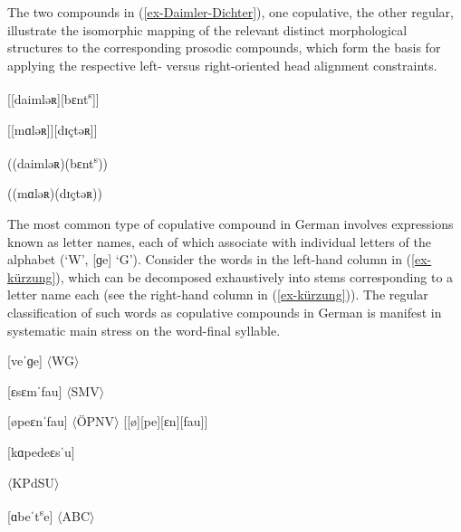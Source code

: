 \documentclass[output=paper
 ,nobabel
 ,draftmode
 ,colorlinks, citecolor=brown
]{langscibook}
\begin{document}
\zl

\largerpage
\enlargethispage{3pt}
\noindent
The two compounds in (\ref{ex-Daimler-Dichter}), one copulative, the other regular, illustrate the isomorphic mapping of the relevant distinct morphological structures to the corresponding prosodic compounds, which form the basis for applying the respective left- versus right-oriented head alignment constraints.


\eal\label{ex-Daimler-Dichter}
\ex {}[[daimləʀ]\textbf{}[bɛnt\textsuperscript{s}]\textbf{}]\textbf{}

\ex {}[[mɑləʀ]]\textbf{}[dɪçtəʀ]\textbf{}]\textbf{}
\z

\ex\label{ex-Daimler-Benz-P} 
\ea ((daimləʀ)(bɛnt\textsuperscript{s}))

\ex ((mɑləʀ)(dɪçtəʀ))
\z
\z


\noindent
The most common type of copulative compound in German involves expressions known as letter names, each of which associate with individual letters of the alphabet (\eg [ve] `W', [ɡe] `G'). Consider the words in the left-hand column in (\ref{ex-kürzung}), which can be decomposed exhaustively into stems corresponding to a letter name each (see the right-hand column in (\ref{ex-kürzung})). The regular classification of such words as copulative compounds in German is manifest in systematic main stress on the word-final syllable. 


\settowidth{}
\eal\label{ex-kürzung}
\ex\label{ex-wg}
{}[veˈɡe] $\langle$WG$\rangle$ 

\ex {}[ɛsɛmˈfau] $\langle$SMV$\rangle$ 

\ex {}[øpeɛnˈfau] $\langle$ÖPNV$\rangle$ [[ø][pe][ɛn][fau]]

\ex\label{ex-kpdsu}
{}[kɑpedeɛsˈu]

$\langle$KPdSU$\rangle$

\ex\label{ex-abc}
{}[ɑbeˈt\textsuperscript{s}e] $\langle$ABC$\rangle$ 
\zl
\end{document}
